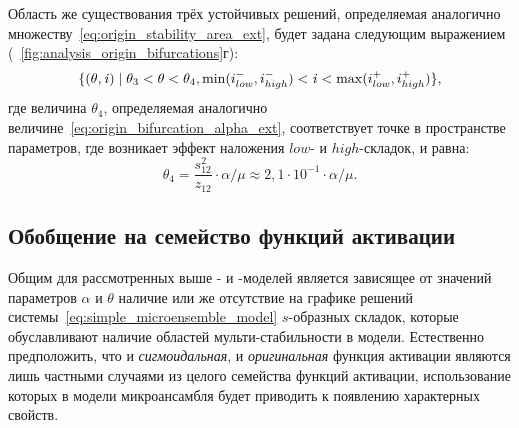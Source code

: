 Область же существования трёх устойчивых решений, определяемая аналогично множеству~\eqref{eq:origin_stability_area_ext}, будет задана следующим выражением (\seefigure~\ref{fig:analysis_origin_bifurcations}г):
\begin{equation}
    \nonumber
    \{ (\theta, \mathit{i}) \mid \theta_{3} < \theta < \theta_{4}, \min(i^{-}_{low}, i^{-}_{high}) < \mathit{i} < \max(i^{+}_{low}, i^{+}_{high}) \},
\end{equation}
где величина $\theta_{4}$, определяемая аналогично величине~\eqref{eq:origin_bifurcation_alpha_ext}, соответствует точке в пространстве параметров, где возникает эффект наложения $low$- и $high$-складок, и равна:
\begin{equation}
    \nonumber
    \theta_{4} = \dfrac{s_{12}^{2}}{z_{12}} \cdot \alpha / \mu \approx 2,1 \cdot 10^{-1} \cdot \alpha / \mu.
\end{equation}



\subsection{Обобщение на семейство функций активации}  \label{subsection:analysis_custom}

Общим для рассмотренных выше - и -моделей является зависящее от значений параметров $\alpha$ и $\theta$ наличие или же отсутствие на графике решений системы~\eqref{eq:simple_microensemble_model} $s$-образных складок, которые обуславливают наличие областей мульти-стабильности в модели. Естественно предположить, что и \textit{сигмоидальная}, и \textit{оригинальная} функция активации являются лишь частными случаями из целого семейства функций активации, использование которых в модели микроансамбля будет приводить к появлению характерных свойств.

